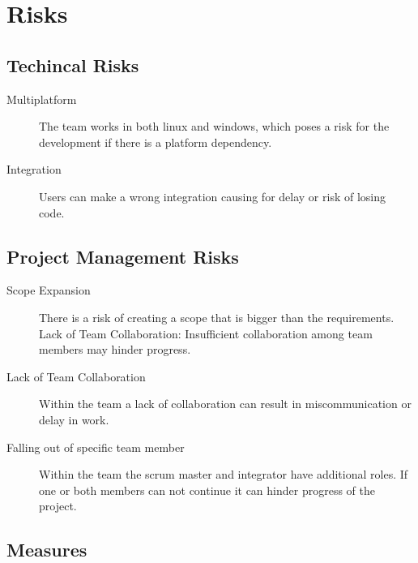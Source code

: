 \documentclass{projdoc}
\begin{document}
\section{Risks}

\subsection{Techincal Risks}

\begin{description}
	\item[Multiplatform] The team works in both linux and windows, which poses a risk
		for the development if there is a platform dependency.
	\item[Integration] Users can make a wrong integration causing for delay or risk of
		losing code.
\end{description}

\subsection{Project Management Risks}

\begin{description}
	\item[Scope Expansion] There is a risk of creating a scope that is bigger than the
		requirements. Lack of Team Collaboration: Insufficient collaboration among team
		members may hinder progress.
	\item[Lack of Team Collaboration] Within the team a lack of collaboration can result in miscommunication or delay in work.
	\item[Falling out of specific team member] Within the team the scrum master and integrator have additional roles. If one or both members can not continue it can hinder progress of the project.
\end{description}

\subsection{Measures}
\end{document}

